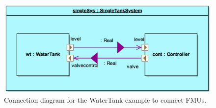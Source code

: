 \begin{figure}[bt]
\centering
\includegraphics[width=.8\columnwidth]{Images/sysml_cd}
\caption{Connection diagram for the WaterTank example to connect FMUs.}
\label{fig:connection}
\end{figure}
